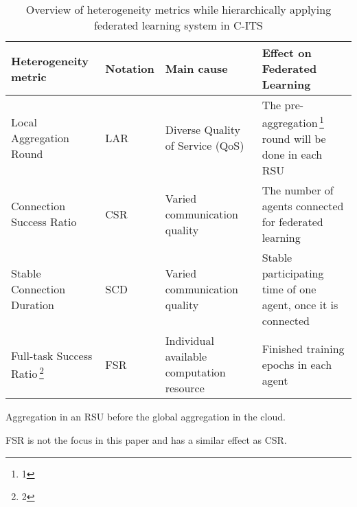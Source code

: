 \begin{table*}[ht]
\begin{threeparttable}
\caption{\centering Overview of heterogeneity metrics while hierarchically applying federated learning system in C-ITS}
\label{table:comparison}
\begin{tabular}{M{3.2cm}M{1cm}M{4.8cm}M{7.1cm}}
   \toprule %
    \centering\textbf{Heterogeneity metric} & \centering\textbf{Notation} & \centering\textbf{Main cause}  & \textbf{Effect on Federated Learning}\\
    \midrule %
   \vspace{1mm}
    Local Aggregation Round  & LAR & Diverse Quality of Service (QoS) & The pre-aggregation\,\footnote{1} round will be done in each RSU \\
   \vspace{1mm}
    Connection Success Ratio  & CSR & Varied communication quality & The number of agents connected for federated learning\\
   \vspace{1mm}
    Stable Connection Duration & SCD & Varied communication quality & Stable participating time of one agent, once it is connected \\
    Full-task Success Ratio\,\footnote{2} & FSR & Individual available computation resource & Finished training epochs in each agent\\
    \bottomrule %
\end{tabular}
\small
\begin{tablenotes}
    \scriptsize 
    \item[1] Aggregation in an RSU before the global aggregation in the cloud.
    \item[2] FSR is not the focus in this paper and has %
    a similar effect as CSR.
\end{tablenotes}
\end{threeparttable}
\end{table*}

